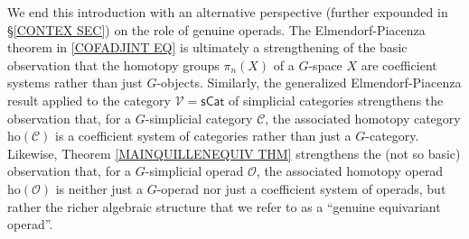 \documentclass[a4paper,10pt
,draft
]{article}%
\numberwithin{equation}{section}
\numberwithin{figure}{section}
\theoremstyle{definition} %
\newcommand{\Set}{\ensuremath{\mathsf{Set}}}
\newcommand{\Top}{\ensuremath{\mathsf{Top}}}
\newcommand{\Op}{\mathsf{Op}}%
\renewcommand{\O}{\ensuremath{\mathcal O}}
\newcommand{\C}{\ensuremath{\mathcal C}}
\newcommand{\1}{\ensuremath{\mathbbm 1}}%
\begin{document}
We end this introduction with an alternative perspective
(further expounded in \S \ref{CONTEX SEC})
on the role of genuine operads.
The Elmendorf-Piacenza theorem in 
\eqref{COFADJINT EQ}
is ultimately a strengthening of the basic observation that the homotopy groups
$\pi_n(X)$ of a $G$-space $X$ are coefficient systems rather than just $G$-objects.
Similarly, the generalized 
Elmendorf-Piacenza result \cite[Thm. 3.17]{Ste16}
applied to the category 
$\mathcal{V}=\mathsf{sCat}$
of simplicial categories strengthens the observation that, 
for a $G$-simplicial category $\C$,
the associated homotopy category
$\text{ho}(\mathcal{C})$
is a coefficient system of categories rather than just a $G$-category.
Likewise, Theorem \ref{MAINQUILLENEQUIV THM}
strengthens the (not so basic) observation that, for a $G$-simplicial operad $\O$, the associated homotopy operad 
$\text{ho}(\mathcal{O})$
is neither just a $G$-operad nor just a coefficient system of operads,
but rather the richer algebraic structure that we refer to as a ``genuine equivariant operad''.


\end{document}
